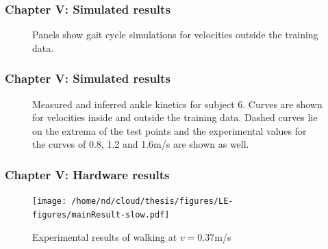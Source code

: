 \documentclass[aspectratio=169]{beamer}
\begin{document}

\begin{frame}
    \frametitle{Chapter V: Simulated results}
    \begin{figure}[ht!]
        \hspace{0.5cm}
        \caption{Panels show gait cycle simulations for velocities outside the training data.}
    \end{figure}
\end{frame}


\begin{frame}
    \frametitle{Chapter V: Simulated results}
    \begin{figure}[ht!]
        \caption{Measured and inferred ankle kinetics for subject 6. Curves are shown for velocities inside and outside the training data. Dashed curves lie on the extrema of the test points and the
experimental values for the curves of 0.8, 1.2 and 1.6m/s are shown as well.}
    \end{figure}
\end{frame}


\begin{frame}
    \frametitle{Chapter V: Hardware results}
    \begin{figure}
        \centering
        \texttt{[image: /home/nd/cloud/thesis/figures/LE-figures/mainResult-slow.pdf]}
        \vspace{-1em}
        \caption{Experimental results of walking at $v=0.37$m/s} 
    \end{figure}
\end{frame}
\end{document}
